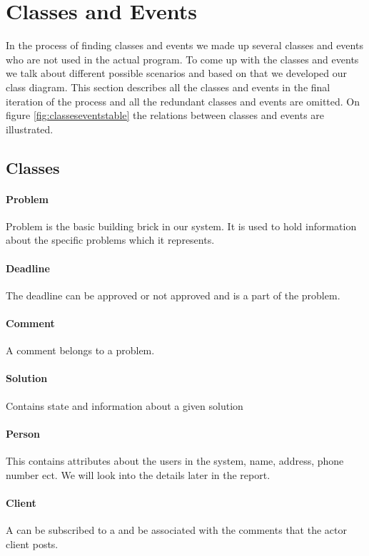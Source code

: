 \section{Classes and Events}
\label{cap:classesevents}
In the process of finding classes and events we made up several classes and events who are not used in the actual program. To come up with the classes and events we talk about different possible scenarios and based on that we developed our class diagram. This section describes all the classes and events in the final iteration of the process and all the redundant classes and events are omitted. On figure \ref{fig:classeseventstable} the relations between classes and events are illustrated.  

\subsection{Classes}

\paragraph{Problem}
Problem is the basic building brick in our system. It is used to hold information about the specific problems which it represents.

\paragraph{Deadline} The deadline can be approved or not approved and is a part of the problem. 

\paragraph{Comment} A comment belongs to a problem. 

\paragraph{Solution}
Contains state and information about a given solution

\paragraph{Person}
This contains attributes about the users in the system, name, address, phone number ect. We will look into the details later in the report.

\paragraph{Client} A  can be subscribed to a  and be associated with the comments that the actor client posts.  
 
